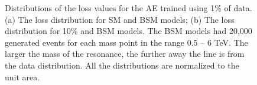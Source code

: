 \begin{figure}[H]
    \begin{center}
    \end{center}
    \caption{Distributions of the loss values for the AE trained using 1\% of data.
    (a) The loss distribution for SM and BSM models; (b) The loss distribution for 10\% and BSM models. 
    The BSM models had 20,000 generated events for each mass point in the range 0.5 -- 6 TeV. 
    The larger the mass of the resonance, the further away the line is from the data distribution.
    All the distributions are normalized to the unit area. 
    }
\label{fig:plot_loss_mc}
\end{figure}

